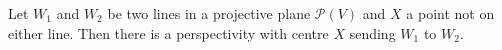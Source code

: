 Let $W_1$ and $W_2$ be two lines in a projective plane $\mathcal{P}(V)$ and $X$ a point not on either line. Then there is a perspectivity with centre $X$ sending $W_1$ to $W_2$.
